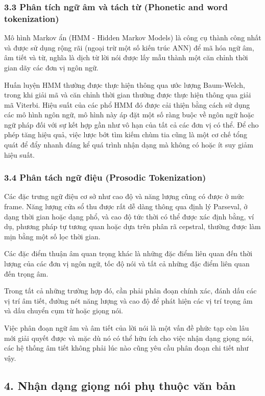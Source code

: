 \documentclass{article}
\begin{document}
	\subsubsection{3.3 Phân tích ngữ âm và tách từ (Phonetic and word tokenization)}
	\qquad Mô hình Markov ẩn (HMM - Hidden Markov Models) là công cụ thành công nhất và được sử dụng rộng rãi (ngoại trừ một số kiến trúc ANN) để mã hóa ngữ âm, âm tiết và từ, nghĩa là dịch từ lời nói được lấy mẫu thành một căn chỉnh thời gian dãy các đơn vị ngôn ngữ.
	
	Huấn luyện HMM thường được thực hiện thông qua ước lượng Baum-Welch, trong khi giải mã và căn chỉnh thời gian thường được thực hiện thông qua giải mã Viterbi. Hiệu suất của các phổ HMM đó được cải thiện bằng cách sử dụng các mô hình ngôn ngữ, mô hình này áp đặt một số ràng buộc về ngôn ngữ hoặc ngữ pháp đối với sự kết hợp gần như vô hạn của tất cả các đơn vị có thể. Để cho phép tăng hiệu quả, việc lược bớt tìm kiếm chùm tia cũng là một cơ chế tổng quát để đẩy nhanh đáng kể quá trình nhận dạng mà không có hoặc ít suy giảm hiệu suất.
	
	\subsubsection{3.4 Phân tách ngữ điệu (Prosodic Tokenization)}
	\qquad Các đặc trưng ngữ điệu cơ sở như cao độ và năng lượng cũng có được ở mức frame. Năng lượng cửa sổ thu được rất dễ dàng thông qua định lý Parseval, ở dạng thời gian hoặc dạng phổ, và cao độ tức thời có thể được xác định bằng, ví dụ, phương pháp tự tương quan hoặc dựa trên phân rã cepstral, thường được làm mịn bằng một số lọc thời gian.
	
	 Các đặc điểm thuận âm quan trọng khác là những đặc điểm liên quan đến thời lượng của các đơn vị ngôn ngữ, tốc độ nói và tất cả những đặc điểm liên quan đến trọng âm. 
	 
	 Trong tất cả những trường hợp đó, cần phải phân đoạn chính xác, đánh dấu các vị trí âm tiết, đường nét năng lượng và cao độ để phát hiện các vị trí trọng âm và dấu chuyển cụm từ hoặc giọng nói. 
	 
	 Việc phân đoạn ngữ âm và âm tiết của lời nói là một vấn đề phức tạp còn lâu mới giải quyết được và mặc dù nó có thể hữu ích cho việc nhận dạng giọng nói, các hệ thống âm tiết không phải lúc nào cũng yêu cầu phân đoạn chi tiết như vậy.
	
	\subsection{4. Nhận dạng giọng nói phụ thuộc văn bản}
	
\end{document}
